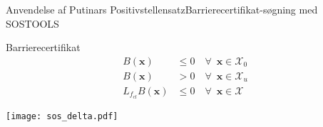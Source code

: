 \begin{frame}{Anvendelse af Putinars Positivstellensatz}{Barrierecertifikat-søgning med SOSTOOLS}
	\vspace{2mm}
\begin{minipage}[b]{0.35\linewidth}
	\begin{block}{Barrierecertifikat}
		\vspace{-5mm}
		\begin{align*}
		B(\mathbf{x})&\leq 0 \quad \forall\,\,\,\mathbf{x}\in\mathcal{X}_0\\
		B(\mathbf{x})&> 0 \quad \forall\,\,\,\mathbf{x}\in\mathcal{X}_u\\
		L_{f_{cl}}B(\mathbf{x})&\leq 0 \quad \forall\,\,\,\mathbf{x}\in\mathcal{X}
		\end{align*}
	\end{block}
\end{minipage}
\hspace{15mm}
\begin{minipage}[b]{0.4\linewidth}
\hspace{3mm}
\texttt{[image: sos\_delta.pdf]}
\end{minipage}


\end{frame}
